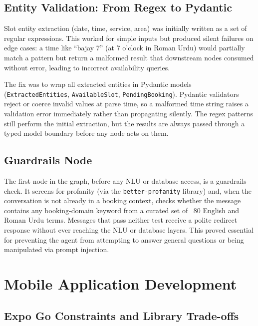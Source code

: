 \subsection{Entity Validation: From Regex to Pydantic}

Slot entity extraction (date, time, service, area) was initially written as a set of regular expressions. This worked for simple inputs but produced silent failures on edge cases: a time like ``bajay 7'' (at 7 o'clock in Roman Urdu) would partially match a pattern but return a malformed result that downstream nodes consumed without error, leading to incorrect availability queries.

The fix was to wrap all extracted entities in Pydantic models (\texttt{ExtractedEntities}, \texttt{AvailableSlot}, \texttt{PendingBooking}). Pydantic validators reject or coerce invalid values at parse time, so a malformed time string raises a validation error immediately rather than propagating silently. The regex patterns still perform the initial extraction, but the results are always passed through a typed model boundary before any node acts on them.

\subsection{Guardrails Node}

The first node in the graph, before any NLU or database access, is a guardrails check. It screens for profanity (via the \texttt{better-profanity} library) and, when the conversation is not already in a booking context, checks whether the message contains any booking-domain keyword from a curated set of ~80 English and Roman Urdu terms. Messages that pass neither test receive a polite redirect response without ever reaching the NLU or database layers. This proved essential for preventing the agent from attempting to answer general questions or being manipulated via prompt injection.

\section{Mobile Application Development}
\label{sec:dev-mobile}

\subsection{Expo Go Constraints and Library Trade-offs}


